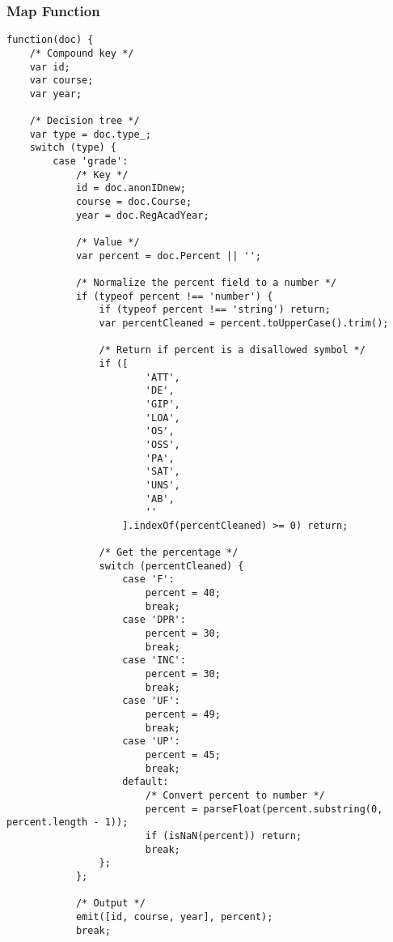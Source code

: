 \subsubsection{Map Function}
\label{3-way-join-map-function}
\begin{verbatim}
function(doc) {
    /* Compound key */
    var id;
    var course;
    var year;

    /* Decision tree */
    var type = doc.type_;
    switch (type) {
        case 'grade':
            /* Key */
            id = doc.anonIDnew;
            course = doc.Course;
            year = doc.RegAcadYear;

            /* Value */
            var percent = doc.Percent || '';

            /* Normalize the percent field to a number */
            if (typeof percent !== 'number') {
                if (typeof percent !== 'string') return;
                var percentCleaned = percent.toUpperCase().trim();

                /* Return if percent is a disallowed symbol */
                if ([
                        'ATT',
                        'DE',
                        'GIP',
                        'LOA',
                        'OS',
                        'OSS',
                        'PA',
                        'SAT',
                        'UNS',
                        'AB',
                        ''
                    ].indexOf(percentCleaned) >= 0) return;

                /* Get the percentage */
                switch (percentCleaned) {
                    case 'F':
                        percent = 40;
                        break;
                    case 'DPR':
                        percent = 30;
                        break;
                    case 'INC':
                        percent = 30;
                        break;
                    case 'UF':
                        percent = 49;
                        break;
                    case 'UP':
                        percent = 45;
                        break;
                    default:
                        /* Convert percent to number */
                        percent = parseFloat(percent.substring(0, percent.length - 1));
                        if (isNaN(percent)) return;
                        break;
                };
            };

            /* Output */
            emit([id, course, year], percent);
            break;


\end{verbatim}
